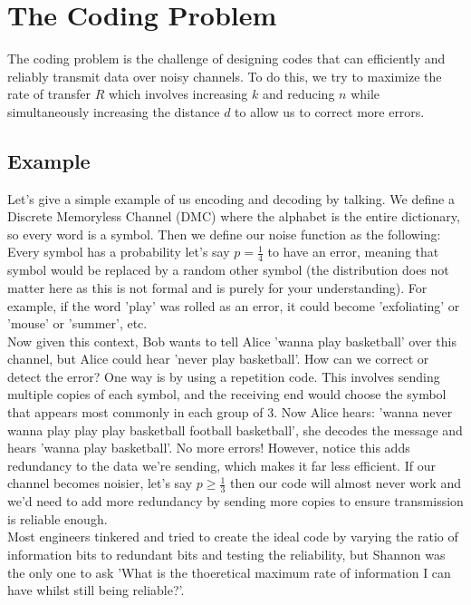 \section{The Coding Problem}

The coding problem is the challenge of designing codes that can efficiently and reliably transmit data over noisy channels. To do this, we try to maximize the rate of transfer $R$ which involves increasing $k$ and reducing $n$ while simultaneously increasing the distance $d$ to allow us to correct more errors. \\

\subsection{Example}


Let's give a simple example of us encoding and decoding by talking. We define a Discrete Memoryless Channel (DMC) where the alphabet is the entire dictionary, so every word is a symbol. Then we define our noise function as the following: Every symbol has a probability let's say $p = \frac{1}{4}$ to have an error, meaning that symbol would be replaced by a random other symbol (the distribution does not matter here as this is not formal and is purely for your understanding). For example, if the word 'play' was rolled as an error, it could become 'exfoliating' or 'mouse' or 'summer', etc. \\

Now given this context, Bob wants to tell Alice 'wanna play basketball' over this channel, but Alice could hear 'never play basketball'. How can we correct or detect the error? One way is by using a repetition code. This involves sending multiple copies of each symbol, and the receiving end would choose the symbol that appears most commonly in each group of 3. Now Alice hears: 'wanna never wanna play play play basketball football basketball', she decodes the message and hears 'wanna play basketball'. No more errors! However, notice this adds redundancy to the data we're sending, which makes it far less efficient. If our channel becomes noisier, let's say $p \ge \frac{1}{3}$ then our code will almost never work and we'd need to add more redundancy by sending more copies to ensure transmission is reliable enough.  \\

Most engineers tinkered and tried to create the ideal code by varying the ratio of information bits to redundant bits and testing the reliability, but Shannon was the only one to ask 'What is the thoeretical maximum rate of information I can have whilst still being reliable?'.  \\


